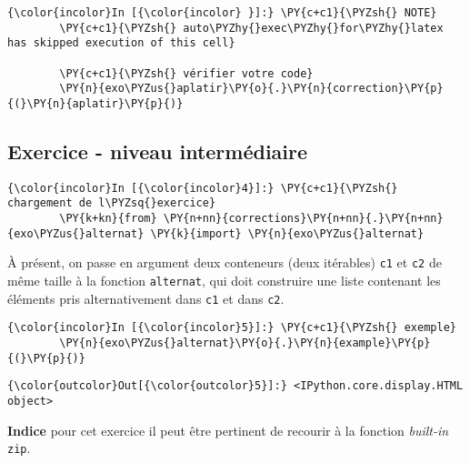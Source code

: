     \begin{Verbatim}[commandchars=\\\{\},frame=single,framerule=0.3mm,rulecolor=\color{cellframecolor}]
{\color{incolor}In [{\color{incolor} }]:} \PY{c+c1}{\PYZsh{} NOTE}
        \PY{c+c1}{\PYZsh{} auto\PYZhy{}exec\PYZhy{}for\PYZhy{}latex has skipped execution of this cell}
        
        \PY{c+c1}{\PYZsh{} vérifier votre code}
        \PY{n}{exo\PYZus{}aplatir}\PY{o}{.}\PY{n}{correction}\PY{p}{(}\PY{n}{aplatir}\PY{p}{)}
\end{Verbatim}


    \hypertarget{exercice---niveau-intermuxe9diaire}{%
\subsection{Exercice - niveau
intermédiaire}\label{exercice---niveau-intermuxe9diaire}}

    \begin{Verbatim}[commandchars=\\\{\},frame=single,framerule=0.3mm,rulecolor=\color{cellframecolor}]
{\color{incolor}In [{\color{incolor}4}]:} \PY{c+c1}{\PYZsh{} chargement de l\PYZsq{}exercice}
        \PY{k+kn}{from} \PY{n+nn}{corrections}\PY{n+nn}{.}\PY{n+nn}{exo\PYZus{}alternat} \PY{k}{import} \PY{n}{exo\PYZus{}alternat}
\end{Verbatim}


    À présent, on passe en argument deux conteneurs (deux itérables)
\texttt{c1} et \texttt{c2} de même taille à la fonction
\texttt{alternat}, qui doit construire une liste contenant les éléments
pris alternativement dans \texttt{c1} et dans \texttt{c2}.

    \begin{Verbatim}[commandchars=\\\{\},frame=single,framerule=0.3mm,rulecolor=\color{cellframecolor}]
{\color{incolor}In [{\color{incolor}5}]:} \PY{c+c1}{\PYZsh{} exemple}
        \PY{n}{exo\PYZus{}alternat}\PY{o}{.}\PY{n}{example}\PY{p}{(}\PY{p}{)}
\end{Verbatim}


\begin{Verbatim}[commandchars=\\\{\},frame=single,framerule=0.3mm,rulecolor=\color{cellframecolor}]
{\color{outcolor}Out[{\color{outcolor}5}]:} <IPython.core.display.HTML object>
\end{Verbatim}
            
    \textbf{Indice} pour cet exercice il peut être pertinent de recourir à
la fonction \emph{built-in} \texttt{zip}.

